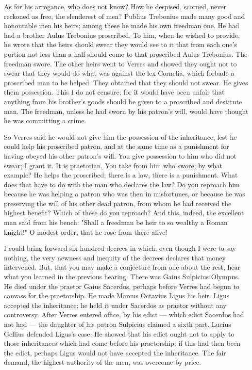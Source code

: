  As for his arrogance, who does not know? How he despised, scorned, never reckoned as free, the slenderest of men? Publius Trebonius made many good and honourable men his heirs; among these he made his own freedman one. He had had a brother Aulus Trebonius proscribed. To him, when he wished to provide, he wrote that the heirs should swear they would see to it that from each one's portion not less than a half should come to that proscribed Aulus Trebonius. The freedman swore. The other heirs went to Verres and showed they ought not to swear that they would do what was against the lex Cornelia, which forbade a proscribed man to be helped. They obtained that they should not swear. He gives them possession. This I do not censure; for it would have been unfair that anything from his brother's goods should be given to a proscribed and destitute man. The freedman, unless he had sworn by his patron's will, would have thought he was committing a crime.

 So Verres said he would not give him the possession of the inheritance, lest he could help his proscribed patron, and at the same time as a punishment for having obeyed his other patron's will. You give possession to him who did not swear; I grant it. It is praetorian. You take from him who swore; by what example? He helps the proscribed; there is a law, there is a punishment. What does that have to do with the man who declares the law? Do you reproach him because he was helping a patron who was then in misfortunes, or because he was preserving the will of his other dead patron, from whom he had received the highest benefit? Which of these do you reproach? And this, indeed, the excellent man said from his bench: "Shall a freedman be heir to so wealthy a Roman knight!" O modest order, that he rose from there alive!

 I could bring forward six hundred decrees in which, even though I were to say nothing, the very newness and inequity of the decrees declares that money intervened. But, that you may make a conjecture from one about the rest, hear what you learned in the previous hearing. There was Gaius Sulpicius Olympus. He died under the praetor Gaius Sacerdos, perhaps before Verres had begun to canvass for the praetorship. He made Marcus Octavius Ligus his heir. Ligus accepted the inheritance; he held it under Sacerdos as praetor without any controversy. After Verres entered office, by his edict --- which edict Sacerdos had not had --- the daughter of his patron Sulpicius claimed a sixth part. Lucius Gellius defended Ligus's case. He showed that his edict ought not to apply to those inheritances which had come before his praetorship; if this had then been the edict, perhaps Ligus would not have accepted the inheritance. The fair demand, the highest authority of the men, was overcome by price.

